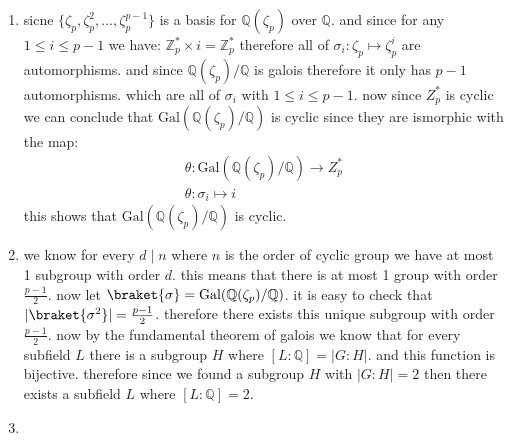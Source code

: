 \begin{enumerate}[label=\textbf{(\textit{\roman*})}]
    \item 
        sicne $\{\zeta_p, \zeta_p^2, ..., \zeta_p^{p - 1}\}$ is a basis for $\mathbb Q(\zeta_p)$ over $\mathbb Q$. and since for any $1 \le i \le p - 1$ we have:
        $\mathbb Z_p^* \times i = \mathbb Z_p^*$ therefore all of $\sigma_i : \zeta_p \mapsto \zeta_p^i$ are automorphisms.
        and since $\mathbb Q(\zeta_p) / \mathbb Q$ is galois therefore it only has $p - 1$ automorphisms. which are all of $\sigma_i$ with $1 \le i \le p - 1$.
        now since $Z_p^*$ is cyclic we can conclude that $\text{Gal}(\mathbb Q(\zeta_p)/\mathbb Q)$ is cyclic since they are ismorphic with the map:
        \begin{gather*}
            \theta: \text{Gal}(\mathbb Q(\zeta_p)/\mathbb Q) \to Z_p^* \\
            \theta: \sigma_i \mapsto i
        \end{gather*}
        this shows that $\text{Gal}(\mathbb Q(\zeta_p)/\mathbb Q)$ is cyclic.
    \item 
        we know for every $d \mid n$ where $n$ is the order of cyclic group we have at most 1 subgroup with order $d$.
        this means that there is at most 1 group with order $\frac{p - 1}{2}$.
        now let $\braket{\sigma} = \text{Gal}(\mathbb Q(\zeta_p)/\mathbb Q)$. it is easy to check that $|\braket{\sigma^2}| = \frac{p - 1}{2}$.
        therefore there exists this unique subgroup with order $\frac{p - 1}{2}$.
        now by the fundamental theorem of galois we know that for every subfield $L$ there is a subgroup $H$ where $[L:\mathbb Q] = |G:H|$. and this function is bijective.
        therefore since we found a subgroup $H$ with $|G:H| = 2$ then there exists a subfield $L$ where $[L:\mathbb Q] = 2$.
    \item 
        
\end{enumerate}
